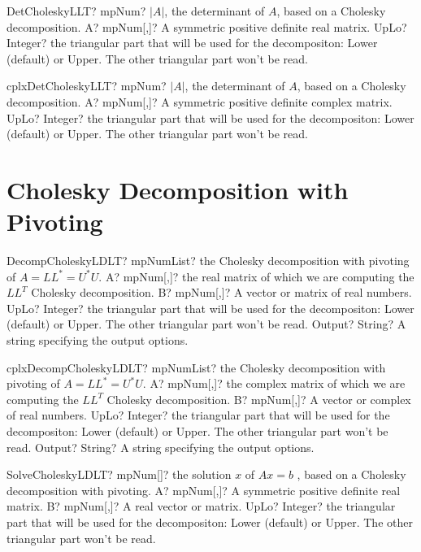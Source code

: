 \documentclass[12pt,a4paper,openany]{book}
\begin{document}
\begin{mpFunctionsExtract}
\mpFunctionTwo
{DetCholeskyLLT? mpNum? $|A|$, the determinant of $A$, based on a Cholesky decomposition.}
{A? mpNum[,]? A symmetric positive definite real matrix.}
{UpLo? Integer? the triangular part that will be used for the decompositon: Lower (default) or Upper. The other triangular part won't be read.}
\end{mpFunctionsExtract}

\begin{mpFunctionsExtract}
\mpFunctionTwo
{cplxDetCholeskyLLT? mpNum? $|A|$, the determinant of $A$, based on a Cholesky decomposition.}
{A? mpNum[,]? A symmetric positive definite complex matrix.}
{UpLo? Integer? the triangular part that will be used for the decompositon: Lower (default) or Upper. The other triangular part won't be read.}
\end{mpFunctionsExtract}

\section{Cholesky Decomposition with Pivoting}

\begin{mpFunctionsExtract}
\mpFunctionFour
{DecompCholeskyLDLT? mpNumList? the Cholesky decomposition with pivoting of $A = LL^* = U^*U$.}
{A? mpNum[,]? the real matrix of which we are computing the $LL^T$ Cholesky decomposition.}
{B? mpNum[,]? A vector or matrix of real numbers.}
{UpLo? Integer? the triangular part that will be used for the decompositon: Lower (default) or Upper. The other triangular part won't be read.}
{Output? String? A string specifying the output options.}
\end{mpFunctionsExtract}

\begin{mpFunctionsExtract}
\mpFunctionFour
{cplxDecompCholeskyLDLT? mpNumList? the Cholesky decomposition with pivoting of $A = LL^* = U^*U$.}
{A? mpNum[,]? the complex matrix of which we are computing the $LL^T$ Cholesky decomposition.}
{B? mpNum[,]? A vector or complex of real numbers.}
{UpLo? Integer? the triangular part that will be used for the decompositon: Lower (default) or Upper. The other triangular part won't be read.}
{Output? String? A string specifying the output options.}
\end{mpFunctionsExtract}

\begin{mpFunctionsExtract}
\mpFunctionThree
{SolveCholeskyLDLT? mpNum[]? the solution $x$ of $A x = b$ , based on a Cholesky decomposition with pivoting.}
{A? mpNum[,]? A symmetric positive definite real matrix.}
{B? mpNum[,]? A real vector or matrix.}
{UpLo? Integer? the triangular part that will be used for the decompositon: Lower (default) or Upper. The other triangular part won't be read.}
\end{mpFunctionsExtract}
\end{document}
